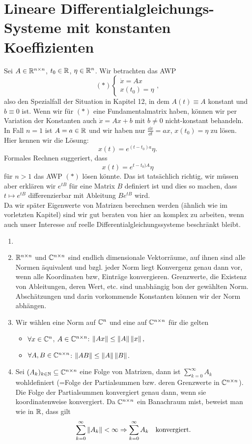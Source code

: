 \chapter{Lineare Differentialgleichungs-Systeme mit konstanten Koeffizienten}
Sei $ A\in\mathbb{R}^{n\times n} $, $ t_0\in\mathbb{R} $, $ \eta\in\mathbb{R}^n $. Wir betrachten das AWP
\[ (\ast)\begin{cases}
\dot x=Ax\\x(t_0)=\eta
\end{cases}, \]
also den Spezialfall der Situation in Kapitel 12, in dem $ A(t)\equiv A $ konstant und $ b\equiv 0 $ ist. Wenn wir f\"ur $ (\ast) $ eine Fundamentalmatrix haben, k\"onnen wir per Variation der Konstanten auch $ \dot x=Ax+b $ mit $ b\neq 0 $ nicht-konstant behandeln.\\
In Fall $ n=1 $ ist $ A=a\in\mathbb{R} $ und wir haben nur $ \frac{\dd x}{\dd t}=ax $, $ x(t_0)=\eta $ zu l\"osen. Hier kennen wir die L\"osung:
\[ x(t)=e^{(t-t_0)a}\eta. \]
Formales Rechnen suggeriert, dass
\[ x(t)=e^{t-t_0)A}\eta \]
f\"ur $ n>1 $ das AWP $ (\ast) $ l\"osen k\"onnte. Das ist tats\"achlich richtig, wir m\"ussen aber erkl\"aren wir $ e^{tB} $ f\"ur eine Matrix $ B $ definiert ist und dies so machen, dass $ t\mapsto e^{tB} $ differenzierbar mit Ableitung $ Be^{tB} $ wird.\\
Da wir sp\"ater Eigenwerte von Matrizen berechnen werden (\"ahnlich wie im vorletzten Kapitel) sind wir gut beraten von hier an komplex zu arbeiten, wenn auch unser Interesse auf reelle Differentialgleichungssysteme beschr\"ankt bleibt.
\begin{bemerkung}
	\begin{enumerate}
		\item[]
		\item $ \mathbb{R}^{n\times n} $ und $ \mathbb{C}^{n\times n} $ sind endlich dimensionale Vektorr\"aume, auf ihnen sind alle Normen \"aquivalent und bzgl. jeder Norm liegt Konvergenz genau dann vor, wenn alle Koordinaten bzw, Eintr\"age konvergieren. Grenzwerte, die Existenz von Ableitungen, deren Wert, etc. sind unabh\"angig bon der gew\"ahlten Norm. Absch\"atzungen und darin vorkommende Konstanten k\"onnen wir der Norm abh\"angen.
		\item Wir w\"ahlen eine Norm auf $ \mathbb{C}^n $ und eine auf $ \mathbb{C}^{n\times n} $ f\"ur die gelten
		\begin{itemize}
			\item $ \forall x\in\mathbb{C}^n $, $ A\in\mathbb{C}^{n\times n} $: $ \left\|Ax\right\|\leq\left\|A\right\|\left\|x\right\|, $
			\item $ \forall A,B\in\mathbb{C}^{n\times n} $: $ \left\|AB\right\|\leq\left\|A\right\|\left\|B\right\| $.
		\end{itemize}
		\item Sei $ (A_k)_{k\in\mathbb{N}}\subseteq\mathbb{C}^{n\times n} $ eine Folge von Matrizen, dann ist $ \sum_{k=0}^{\infty}A_k $ wohldefiniert (=Folge der Partialsummen bzw. deren Grenzwerte in $ \mathbb{C}^{n\times n} $). Die Folge der Partialsummen konvergiert genau dann, wenn sie koordinatenweise konvergiert. Da $ \mathbb{C}^{n\times n} $ ein Banachraum mist, beweist man wie in $ \mathbb{R} $, dass gilt
		\[ \sum_{k=0}^{\infty}\left\|A_k\right\|<\infty\Rightarrow\sum_{k=0}^{\infty}A_k\quad\text{konvergiert}. \]
	\end{enumerate}
\end{bemerkung}
